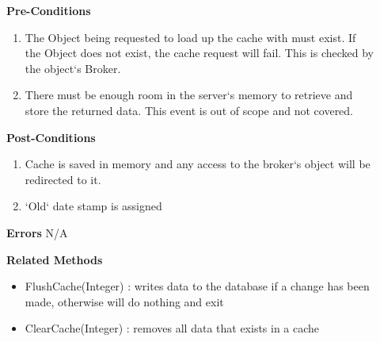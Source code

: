 \documentclass[letterpaper,12pt]{report}
\begin{document}
{\begin{description}
      \item[] \textbf{Pre-Conditions}
	  \begin{enumerate}
	   \item The Object being requested to load up the cache with must exist. If the Object does not exist, the cache request will fail. This is checked by the object`s Broker.
	   \item There must be enough room in the server`s memory to retrieve and store the returned data. This event is out of scope and not covered.
	  \end{enumerate}
      \item[] \textbf{Post-Conditions}
	  \begin{enumerate}
	   \item Cache is saved in memory and any access to the broker`s object will be redirected to it.
	   \item `Old` date stamp is assigned
	  \end{enumerate}
      \item[] \textbf{Errors}
	  \newline \hspace*{1cm} N/A
      \item[] \textbf{Related Methods}
	  \begin{itemize}
	   \item FlushCache(Integer) : writes data to the database if a change has been made, otherwise will do nothing and exit
	   \item ClearCache(Integer) : removes all data that exists in a cache
	  \end{itemize}

     \end{description}
}
\end{document}
